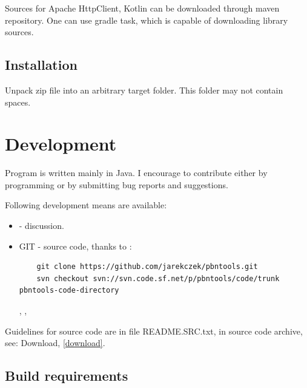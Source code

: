 \documentclass[polish,a4paper,11pt,oneside]{article}
\begin{document}
Sources for Apache HttpClient, Kotlin can be downloaded through maven repository.
One can use gradle task, which is capable of downloading library sources.

\subsection{Installation}
Unpack zip file into an arbitrary target folder.
This folder may not contain spaces.

\section{Development} \label{dev}

Program is written mainly in Java.
I encourage to contribute either by programming or by submitting bug reports and suggestions.

Following development means are available:

\begin{itemize}
\item
   -
  discussion.
  
\item
  GIT - source code, thanks to 
  :
  \begin{verbatim}
    git clone https://github.com/jarekczek/pbntools.git
    svn checkout svn://svn.code.sf.net/p/pbntools/code/trunk pbntools-code-directory
  \end{verbatim}

  ,
  , 

\end{itemize}

Guidelines for source code are in file README.SRC.txt,
in source code archive, see: Download, \ref{download}.

\subsection{Build requirements}
\end{document}
